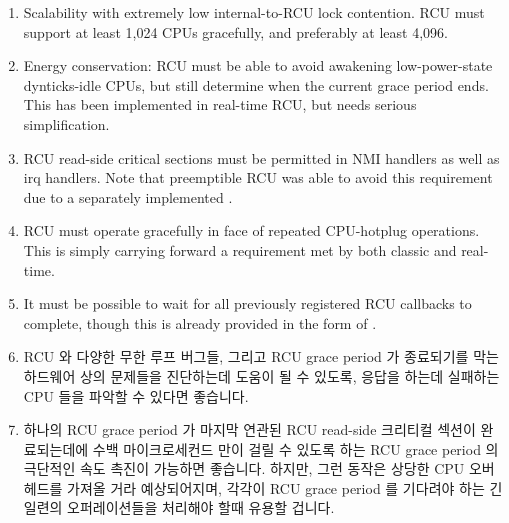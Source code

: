\begin{enumerate}
\item	Scalability with extremely low internal-to-RCU lock contention.
	RCU must support at least 1,024 CPUs gracefully, and preferably
	at least 4,096.
\item	Energy conservation: RCU must be able to avoid awakening
	low-power-state dynticks-idle CPUs, but still determine
	when the current grace period ends.
	This has been implemented in real-time RCU, but needs serious
	simplification.
\item	RCU read-side critical sections must be permitted in NMI
	handlers as well as irq handlers.  Note that preemptible RCU
	was able to avoid this requirement due to a separately
	implemented .
\item	RCU must operate gracefully in face of repeated CPU-hotplug
	operations.
	This is simply carrying forward a requirement met by both
	classic and real-time.
\item	It must be possible to wait for all previously registered
	RCU callbacks to complete, though this is already provided
	in the form of .
\fi
\item	RCU 와 다양한 무한 루프 버그들, 그리고 RCU grace period 가 종료되기를
	막는 하드웨어 상의 문제들을 진단하는데 도움이 될 수 있도록, 응답을
	하는데 실패하는 CPU 들을 파악할 수 있다면 좋습니다.
\item	하나의 RCU grace period 가 마지막 연관된 RCU read-side 크리티컬 섹션이
	완료되는데에 수백 마이크로세컨드 만이 걸릴 수 있도록 하는 RCU grace
	period 의 극단적인 속도 촉진이 가능하면 좋습니다.
	하지만, 그런 동작은 상당한 CPU 오버헤드를 가져올 거라 예상되어지며,
	각각이 RCU grace period 를 기다려야 하는 긴 일련의 오퍼레이션들을
	처리해야 할때 유용할 겁니다.
\iffalse

\item	Detecting CPUs that are failing to respond is desirable,
	to assist diagnosis both of RCU and of various infinite
	loop bugs and hardware failures that can prevent RCU grace
	periods from ending.
\item	Extreme expediting of RCU grace periods is desirable,
	so that an RCU grace period can be forced to complete within
	a few hundred microseconds of the last relevant RCU read-side
	critical second completing.
	However, such an operation would be expected to incur
	severe CPU overhead, and would be primarily useful when
	carrying out a long sequence of operations that each needed
	to wait for an RCU grace period.
\fi
\end{enumerate}

